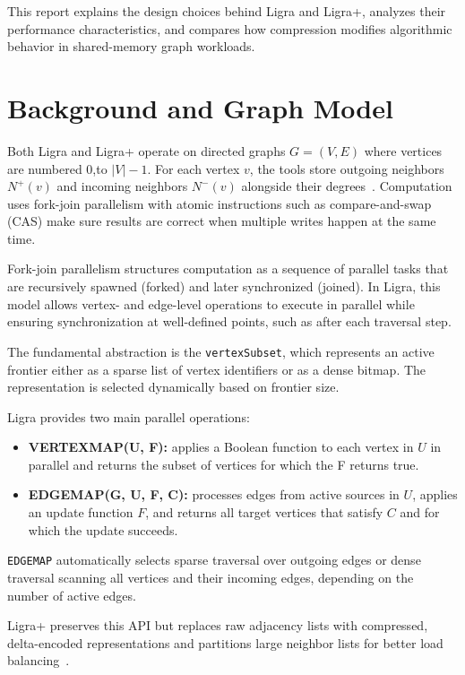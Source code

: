 \documentclass[a4paper,USenglish]{lipics-v2021}
\begin{document}
This report explains the design choices behind Ligra and Ligra+, analyzes their performance characteristics, and compares how compression modifies algorithmic behavior in shared-memory graph workloads.

\section{Background and Graph Model}
Both Ligra and Ligra+ operate on directed graphs $G=(V,E)$ where vertices are numbered $0$,to $|V|-1$. For each vertex $v$, the tools store outgoing neighbors $N^+(v)$ and incoming neighbors $N^{-}(v)$ alongside their degrees~\cite{shun2013ligra}. Computation uses fork-join parallelism with atomic instructions such as compare-and-swap (CAS) make sure results are correct when multiple writes happen at the same time.

Fork-join parallelism structures computation as a sequence of parallel tasks that are recursively spawned (forked) and later synchronized (joined). In Ligra, this model allows vertex- and edge-level operations to execute in parallel while ensuring synchronization at well-defined points, such as after each traversal step.

The fundamental abstraction is the \texttt{vertexSubset}, which represents an active frontier either as a sparse list of vertex identifiers or as a dense bitmap. The representation is selected dynamically based on frontier size.

Ligra provides two main parallel operations:

\begin{itemize}
    \item \textbf{VERTEXMAP(U, F):} applies a Boolean function to each vertex in $U$ in parallel and returns the subset of vertices for which the  F returns true.
    \item \textbf{EDGEMAP(G, U, F, C):} processes edges from active sources in $U$, applies an update function $F$, and returns all target vertices that satisfy $C$ and for which the update succeeds.

\end{itemize}

\texttt{EDGEMAP} automatically selects sparse traversal over outgoing edges or dense traversal scanning all vertices and their incoming edges, depending on the number of active edges.

Ligra+ preserves this API but replaces raw adjacency lists with compressed, delta-encoded representations and partitions large neighbor lists for better load balancing~\cite{shun2015ligra+}.
\end{document}
